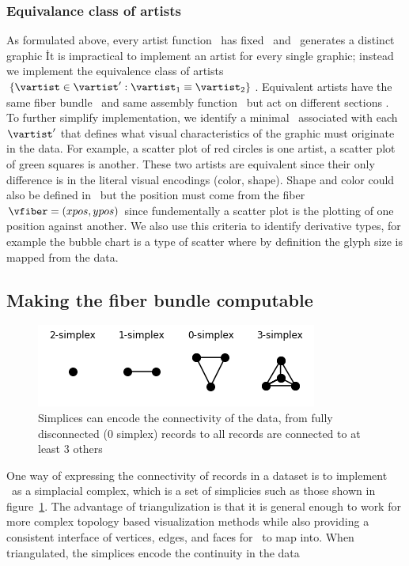 \documentclass[../main.tex]{subfiles}
\begin{document}
\subsubsection{Equivalance class of artists}
As formulated above, every artist function \vartist\ has fixed \vchannel\ and \vmark\ generates a distinct graphic \gsection\. It is impractical to implement an artist for every single graphic; instead we implement the equivalence class of artists $\{\vartist \in \vartist^{\prime}: \vartist_{1} \equiv \vartist_{2}\}$. Equivalent artists have the same fiber bundle \vtotal\ and same assembly function \vmark\, but act on different sections \vsection. To further simplify implementation, we identify a minimal \vfiber\ associated with each $\vartist^{\prime}$ that defines what visual characteristics of the graphic must originate in the data. For example, a scatter plot of red circles is one artist, a scatter plot of green squares is another. These two artists are equivalent since their only difference is in the literal visual encodings (color, shape). Shape and color could also be defined in \vmark\, but the position must come from the fiber $\vfiber=(xpos,ypos)$ since fundementally a scatter plot is the plotting of one position against another\cite{friendlyBriefHistoryData2008}. We also use this criteria to identify derivative types, for example the bubble chart\cite{tufteVisualDisplayQuantitative2001} is a type of scatter where by definition the glyph size is mapped from the data. 

\subsection{Making the fiber bundle computable}
\label{sec:triangulization}
\begin{figure}[H]
    \includegraphics{figures/math/simplex.png}
    \caption{Simplices can encode the connectivity of the data, from fully disconnected (0 simplex) records to all records are connected to at least 3 others}
    \label{fig:triangle_simplex}
\end{figure}
One way of expressing the connectivity of records in a dataset is to implement \dbase\ as a simplacial complex, which is a set of simplicies such as those shown in figure~\ref{fig:triangle_simplex}. The advantage of triangulization is that it is general enough to work for more complex topology based visualization methods \cite{heineSurveyTopologybasedMethods2016} while also providing a consistent interface of vertices, edges, and faces for \vindex\ to map into. When triangulated, the simplices encode the continuity in the data
\end{document}

